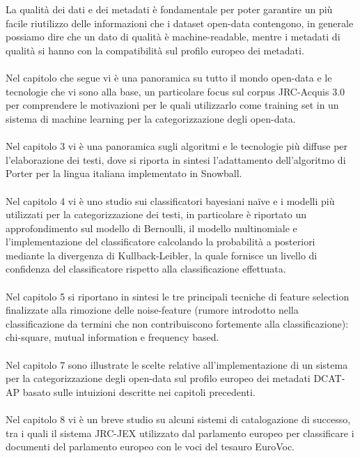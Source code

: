 \documentclass{article}
\theoremstyle{plain}
\theoremstyle{definition}
\begin{document}
\\
\\
La qualità dei dati e dei metadati è fondamentale per poter garantire un più facile riutilizzo delle informazioni che i dataset open-data contengono, in generale possiamo dire che un dato di qualità è machine-readable, mentre i metadati di qualità si hanno con la compatibilità sul profilo europeo dei metadati.
\\
\\
Nel capitolo che segue vi è una panoramica su tutto il mondo open-data e le tecnologie che vi sono alla base, un particolare focus sul corpus JRC-Acquis 3.0 per comprendere le motivazioni per le quali utilizzarlo come training set in un sistema di machine learning per la categorizzazione degli open-data.
\\
\\
Nel capitolo 3 vi è una panoramica sugli algoritmi e le tecnologie più diffuse per l'elaborazione dei testi, dove si riporta in sintesi l'adattamento dell'algoritmo di Porter per la lingua italiana implementato in Snowball.
\\
\\
Nel capitolo 4 vi è uno studio sui classificatori bayesiani naïve e i modelli più utilizzati per la categorizzazione dei testi, in particolare è riportato un approfondimento sul modello di Bernoulli, il modello multinomiale e l'implementazione del classificatore calcolando la probabilità a posteriori mediante la divergenza di Kullback-Leibler, la quale fornisce un livello di confidenza del classificatore rispetto alla classificazione effettuata.
\\
\\
Nel capitolo 5 si riportano in sintesi le tre principali tecniche di feature selection finalizzate alla rimozione delle noise-feature (rumore introdotto nella classificazione da termini che non contribuiscono fortemente alla classificazione): chi-square, mutual information e frequency based.
\\
\\
Nel capitolo 7 sono illustrate le scelte relative all'implementazione di un sistema per la categorizzazione degli open-data sul profilo europeo dei metadati DCAT-AP basato sulle intuizioni descritte nei capitoli precedenti.
\\
\\
Nel capitolo 8 vi è un breve studio su alcuni sistemi di catalogazione di successo, tra i quali il sistema JRC-JEX utilizzato dal parlamento europeo per classificare i documenti del parlamento europeo con le voci del tesauro EuroVoc.
\end{document}
